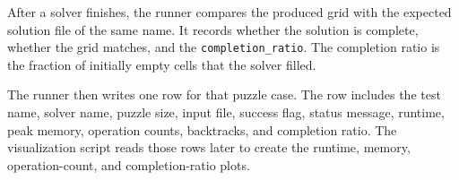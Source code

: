 After a solver finishes, the runner compares the produced grid with the expected
solution file of the same name. It records whether the solution is complete,
whether the grid matches, and the \texttt{completion\_ratio}. The completion
ratio is the fraction of initially empty cells that the solver filled.

The runner then writes one row for that puzzle case. The row includes the test
name, solver name, puzzle size, input file, success flag, status message,
runtime, peak memory, operation counts, backtracks, and completion ratio. The
visualization script reads those rows later to create the runtime, memory,
operation-count, and completion-ratio plots.
